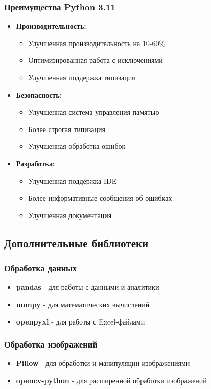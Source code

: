 \documentclass[12pt,a4paper]{article}
\begin{document}
\subsubsection{Преимущества Python 3.11}
\begin{itemize}
    \item \textbf{Производительность:}
    \begin{itemize}
        \item Улучшенная производительность на 10-60\%
        \item Оптимизированная работа с исключениями
        \item Улучшенная поддержка типизации
    \end{itemize}
    \item \textbf{Безопасность:}
    \begin{itemize}
        \item Улучшенная система управления памятью
        \item Более строгая типизация
        \item Улучшенная обработка ошибок
    \end{itemize}
    \item \textbf{Разработка:}
    \begin{itemize}
        \item Улучшенная поддержка IDE
        \item Более информативные сообщения об ошибках
        \item Улучшенная документация
    \end{itemize}
\end{itemize}

\subsection{Дополнительные библиотеки}
\subsubsection{Обработка данных}
\begin{itemize}
    \item \textbf{pandas} - для работы с данными и аналитики
    \item \textbf{numpy} - для математических вычислений
    \item \textbf{openpyxl} - для работы с Excel-файлами
\end{itemize}

\subsubsection{Обработка изображений}
\begin{itemize}
    \item \textbf{Pillow} - для обработки и манипуляции изображениями
    \item \textbf{opencv-python} - для расширенной обработки изображений
\end{itemize}
\end{document}
